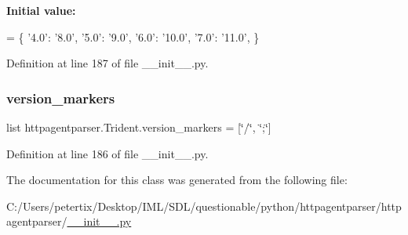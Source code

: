 {\bfseries Initial value\+:}
\begin{DoxyCode}
=  \{
        \textcolor{stringliteral}{'4.0'}: \textcolor{stringliteral}{'8.0'},
        \textcolor{stringliteral}{'5.0'}: \textcolor{stringliteral}{'9.0'},
        \textcolor{stringliteral}{'6.0'}: \textcolor{stringliteral}{'10.0'},
        \textcolor{stringliteral}{'7.0'}: \textcolor{stringliteral}{'11.0'},
    \}
\end{DoxyCode}


Definition at line 187 of file \+\_\+\+\_\+init\+\_\+\+\_\+.\+py.

\hypertarget{classhttpagentparser_1_1_trident_a4461af8f9aee48d3001f40fc2ab62cae}{}\label{classhttpagentparser_1_1_trident_a4461af8f9aee48d3001f40fc2ab62cae} 
\subsubsection{\texorpdfstring{version\+\_\+markers}{version\_markers}}
{\footnotesize\ttfamily list httpagentparser.\+Trident.\+version\+\_\+markers = \mbox{[}\char`\"{}/\char`\"{}, \char`\"{};\char`\"{}\mbox{]}\hspace{0.3cm}{\ttfamily [static]}}



Definition at line 186 of file \+\_\+\+\_\+init\+\_\+\+\_\+.\+py.



The documentation for this class was generated from the following file\+:\begin{DoxyCompactItemize}
\item 
C\+:/\+Users/petertix/\+Desktop/\+I\+M\+L/\+S\+D\+L/questionable/python/httpagentparser/httpagentparser/\hyperlink{____init_____8py}{\+\_\+\+\_\+init\+\_\+\+\_\+.\+py}\end{DoxyCompactItemize}
